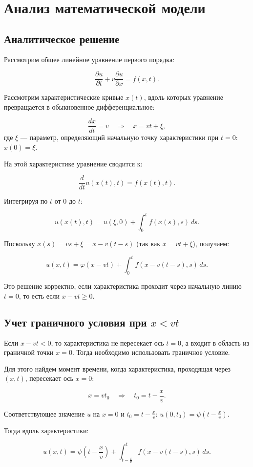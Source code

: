 \chapter{Анализ математической модели}
\section{Аналитическое решение}
Рассмотрим общее линейное уравнение первого порядка:

\[
\frac{\partial u}{\partial t} + v \frac{\partial u}{\partial x} = f(x,t).
\]

Рассмотрим характеристические кривые $x(t)$, вдоль которых уравнение превращается в обыкновенное дифференциальное:

\[
\frac{dx}{dt} = v \quad \Rightarrow \quad x = vt + \xi,
\]
где $\xi$ — параметр, определяющий начальную точку характеристики при $t=0$: $x(0) = \xi$.

На этой характеристике уравнение сводится к:

\[
\frac{d}{dt} u(x(t), t) = f(x(t), t).
\]

Интегрируя по $t$ от $0$ до $t$:

\[
u(x(t), t) = u(\xi, 0) + \int_0^t f(x(s), s)\, ds.
\]

Поскольку $x(s) = vs + \xi = x - v(t - s)$ (так как $x = vt + \xi$), получаем:

\[
u(x,t) = \varphi(x - vt) + \int_0^t f(x - v(t - s), s)\, ds.
\]

Это решение корректно, если характеристика проходит через начальную линию $t=0$, то есть если $x - vt \ge 0$.

\section*{Учет граничного условия при $x < vt$}

Если $x - vt < 0$, то характеристика не пересекает ось $t=0$, а входит в область из граничной точки $x = 0$. Тогда необходимо использовать граничное условие.

Для этого найдем момент времени, когда характеристика, проходящая через $(x,t)$, пересекает ось $x=0$:

\[
x = v t_0 \quad \Rightarrow \quad t_0 = t - \frac{x}{v}.
\]

Соответствующее значение $u$ на $x=0$ и $t_0 = t - \frac{x}{v}$: $u(0, t_0) = \psi(t - \frac{x}{v})$.

Тогда вдоль характеристики:

\[
u(x,t) = \psi\left(t - \frac{x}{v}\right) + \int_{t - \frac{x}{v}}^t f(x - v(t - s), s)\, ds.
\]

